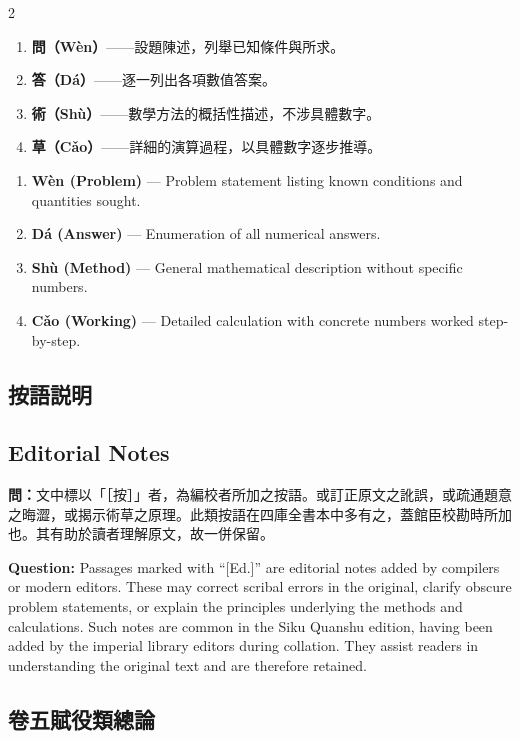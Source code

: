 \documentclass[11pt,a4paper]{article}
\newcommand{\QuestionText}[1]{\par\noindent\textbf{\color{problemcolor}問：}#1\par}
\newcommand{\QuestionEn}[1]{\par\noindent\textbf{\color{problemcolor}Question:} #1\par}
\begin{document}
\begin{paracol}{2}
\begin{enumerate}[leftmargin=1.5em]
\item \textbf{問（W\`{e}n）}——設題陳述，列舉已知條件與所求。
\item \textbf{答（D\'{a}）}——逐一列出各項數值答案。
\item \textbf{術（Sh\`{u}）}——數學方法的概括性描述，不涉具體數字。
\item \textbf{草（C\v{a}o）}——詳細的演算過程，以具體數字逐步推導。
\end{enumerate}
\switchcolumn
\begin{enumerate}[leftmargin=1.5em]
\item \textbf{W\`{e}n (Problem)} --- Problem statement listing known conditions and quantities sought.
\item \textbf{D\'{a} (Answer)} --- Enumeration of all numerical answers.
\item \textbf{Sh\`{u} (Method)} --- General mathematical description without specific numbers.
\item \textbf{C\v{a}o (Working)} --- Detailed calculation with concrete numbers worked step-by-step.
\end{enumerate}
\switchcolumn*

\subsection*{按語説明}
\switchcolumn
\subsection*{Editorial Notes}
\switchcolumn*

\QuestionText{文中標以「［按］」者，為編校者所加之按語。或訂正原文之訛誤，或疏通題意之晦澀，或揭示術草之原理。此類按語在四庫全書本中多有之，蓋館臣校勘時所加也。其有助於讀者理解原文，故一併保留。}
\switchcolumn
\QuestionEn{Passages marked with ``[Ed.]'' are editorial notes added by compilers or modern editors. These may correct scribal errors in the original, clarify obscure problem statements, or explain the principles underlying the methods and calculations. Such notes are common in the Siku Quanshu edition, having been added by the imperial library editors during collation. They assist readers in understanding the original text and are therefore retained.}
\switchcolumn*

\subsection*{卷五賦役類總論}
\switchcolumn

\end{paracol}
\end{document}
